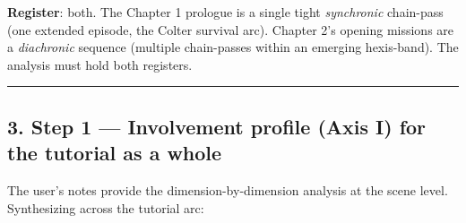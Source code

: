 \documentclass[11pt]{report}
\begin{document}
\textbf{Register}: both. The Chapter 1 prologue is a single tight \textit{synchronic} chain-pass (one extended episode, the Colter survival arc). Chapter 2's opening missions are a \textit{diachronic} sequence (multiple chain-passes within an emerging hexis-band). The analysis must hold both registers.


\vspace{0.4em}\hrule\vspace{0.8em}


\subsection{3. Step 1 — Involvement profile (Axis I) for the tutorial as a whole}


The user's notes provide the dimension-by-dimension analysis at the scene level. Synthesizing across the tutorial arc:
\end{document}
